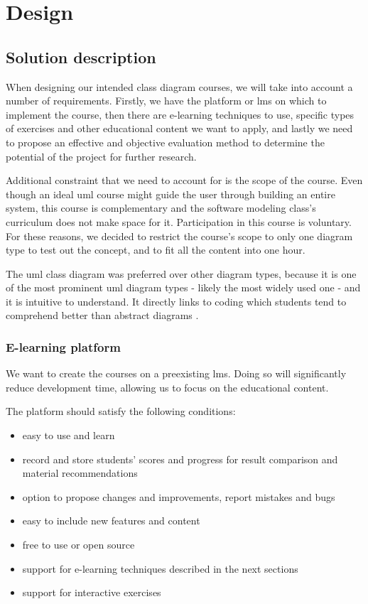 \chapter{Design}
\label{chapter:design}
\section{Solution description}

When designing our intended class diagram courses, we will take into account a number of requirements. Firstly, we have the platform or \ac{lms} on which to implement the course, then there are e-learning techniques to use, specific types of exercises and other educational content we want to apply, and lastly we need to propose an effective and objective evaluation method to determine the potential of the project for further research. 

Additional constraint that we need to account for is the scope of the course. Even though an ideal \ac{uml} course might guide the user through building an entire system, this course is complementary and the software modeling class's curriculum does not make space for it. Participation in this course is voluntary. For these reasons, we decided to restrict the course's scope to only one diagram type to test out the concept, and to fit all the content into one hour. 

The \ac{uml} class diagram was preferred over other diagram types, because it is one of the most prominent \ac{uml} diagram types - likely the most widely used one - and it is intuitive to understand. It directly links to coding which students tend to comprehend better than abstract diagrams \cite{umple}.

\subsection{E-learning platform}

We want to create the courses on a preexisting \ac{lms}. Doing so will significantly reduce development time, allowing us to focus on the educational content. 

The platform should satisfy the following conditions:

\begin{itemize}
    \item easy to use and learn
    \item record and store students' scores and progress for result comparison and material recommendations 
    \item option to propose changes and improvements, report mistakes and bugs
    \item easy to include new features and content 
    \item free to use or open source
    \item support for e-learning techniques described in the next sections %
    \item support for interactive exercises
\end{itemize}

